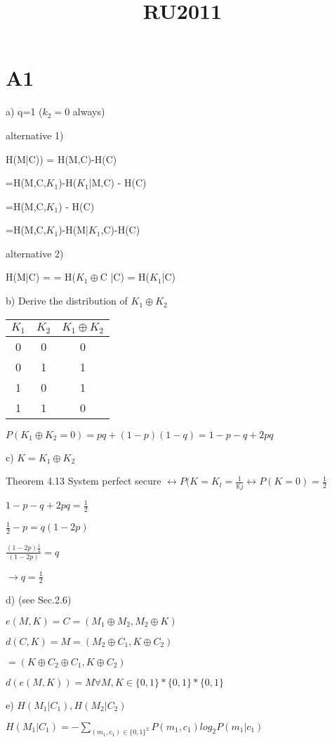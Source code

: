 \documentclass[a4paper]{article}
\begin{document}
\title{RU2011}
\section{A1} 

a) q=1 ($k_2=0$ always)

alternative 1)

H(M|C)) = H(M,C)-H(C)

=H(M,C,$K_1$)-H($K_1$|M,C) - H(C)

=H(M,C,$K_1$) - H(C)

=H(M,C,$K_1$)-H(M|$K_1$,C)-H(C)

alternative 2)

H(M|C) = = H($K_1 \oplus $C |C) = H($K_1$|C)

b) Derive the distribution of $K_1 \oplus K_2$

\begin{table}[h]
	\begin{tabular}{c|c|c}
$K_1$ & $K_2$ & $K_1 \oplus K_2$ \\
\hline
0 & 0 & 0 \\
0 & 1 & 1 \\
1 & 0 & 1 \\
1 & 1 & 0 
	\end{tabular}
\end{table}

$P(K_1 \oplus K_2 = 0) = pq + (1-p)(1-q) = 1-p-q+2pq$


c) $K = K_1 \oplus K_2$

Theorem 4.13 System perfect secure $\leftrightarrow P(K=K_l=\frac{1}{\mathbb{K}j} \leftrightarrow P(K=0) = \frac{1}{2}$

$1-p-q+2pq = \frac{1}{2}$

$\frac{1}{2} - p = q (1-2p)$

$\frac{(1-2p)\frac{1}{2}}{(1-2p)} = q$

$\rightarrow q = \frac{1}{2}$

d) (see Sec.2.6)

$e(M,K) = C = (M_1 \oplus M_2, M_2 \oplus K)$

$d(C,K)=M=(M_2\oplus C_1, K \oplus C_2)$

$= (K \oplus C_2 \oplus C_1,K \oplus C_2)$

$d(e(M,K)) = M \forall M,K \in \{0,1\}\ast \{0,1\}\ast \{0,1\}$

e) $H(M_1|C_1),H(M_2|C_2)$

$H(M_1|C_1)=-\displaystyle \sum\limits_{(m_1,c_1)\in \{0,1\}^2} P(m_1,c_1) log_2 P(m_1|c_1)$
\end{document}
